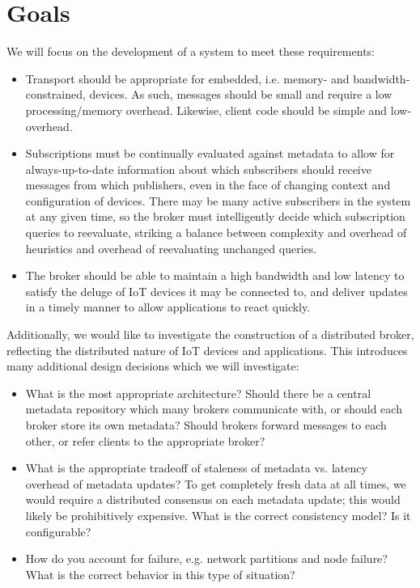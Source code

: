 \documentclass{article}
\begin{document}
\section{Goals}

We will focus on the development of a system to meet these requirements: 
\begin{itemize}[noitemsep]
\item Transport should be appropriate for embedded, i.e. memory- and bandwidth-constrained,
devices. As such, messages should be small and require a low processing/memory overhead. 
Likewise, client code should be simple and low-overhead. 
\item Subscriptions must be continually evaluated against metadata to allow for always-up-to-date
information about which subscribers should receive messages from which publishers, even in the
face of changing context and configuration of devices. There may be many active subscribers in the system
at any given time, so the broker must intelligently decide which subscription queries to reevaluate, 
striking a balance between complexity and overhead of heuristics and overhead of reevaluating unchanged queries. 
\item The broker should be able to maintain a high bandwidth and low latency to satisfy the deluge
of IoT devices it may be connected to, and deliver updates in a timely manner to allow applications
to react quickly. 
\end{itemize}

Additionally, we would like to investigate the construction of a distributed broker, reflecting the
distributed nature of IoT devices and applications. This introduces many additional design decisions 
which we will investigate:
\begin{itemize}[noitemsep]
\item What is the most appropriate architecture? Should there be a central metadata repository 
which many brokers communicate with, or should each broker store its own metadata? Should brokers
forward messages to each other, or refer clients to the appropriate broker? 
\item What is the appropriate tradeoff of staleness of metadata vs. latency overhead of metadata updates?
To get completely fresh data at all times, we would require a distributed consensus on each metadata update; 
this would likely be prohibitively expensive. What is the correct consistency model? Is it configurable?
\item How do you account for failure, e.g. network partitions and node failure? What is the correct behavior in 
this type of situation?
\end{itemize}
\end{document}

